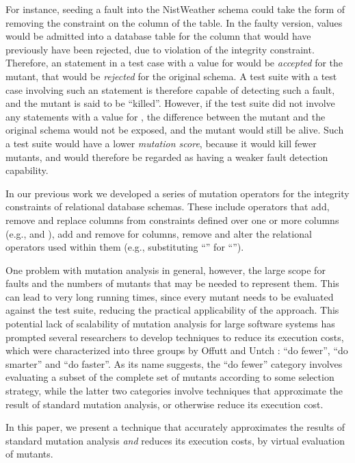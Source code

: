 For instance, seeding a fault into the NistWeather schema could take the form of removing the \NOTNULL constraint on the  column of the  table. In the faulty version, \NULL values would be admitted into a database table for the  column that would have previously have been rejected, due to violation of the integrity constraint. Therefore, an \INSERT statement in a test case with a \NULL value for  would be {\it accepted} for the mutant, that would be {\it rejected} for the original schema. A test suite with a test case involving such an \INSERT statement is therefore capable of detecting such a fault, and the mutant is said to be ``killed''. However, if the test suite did not involve any \INSERT statements with a \NULL value for , the difference between the mutant and the original schema would not be exposed, and the mutant would still be alive. Such a test suite would have a lower {\it mutation score}, because it would kill fewer mutants, and would therefore be regarded as having a weaker fault detection capability. 

In our previous work \cite{Kapfhammer2013,Wright2013,Wright2014} we developed a series of mutation operators for the integrity constraints of relational database schemas. These include operators that add, remove and replace columns from constraints defined over one or more columns (e.g., \PK and \FKCs), add and remove \NNCs for columns, remove \CCs and alter the relational operators used within them (e.g., substituting ``\sql{>}'' for ``\sql{>=}''). 

One problem with mutation analysis in general, however, the large scope for faults and the numbers of mutants that may be needed to represent them. This can lead to very long running times, since every mutant needs to be evaluated against the test suite, reducing the practical applicability of the approach. This potential lack of scalability of mutation analysis for large software systems has prompted several researchers to develop techniques to reduce its execution costs, which were characterized into three groups by Offutt and Untch \cite{Offutt2001}: ``do fewer'', ``do smarter'' and ``do faster''. As its name suggests, the ``do fewer'' category involves evaluating a subset of the complete set of mutants according to some selection strategy, while the latter two categories involve techniques that approximate the result of standard mutation analysis, or otherwise reduce its execution cost.  

In this paper, we present a technique that accurately approximates the results of standard mutation analysis {\it and} reduces its execution costs, by virtual evaluation of mutants.

